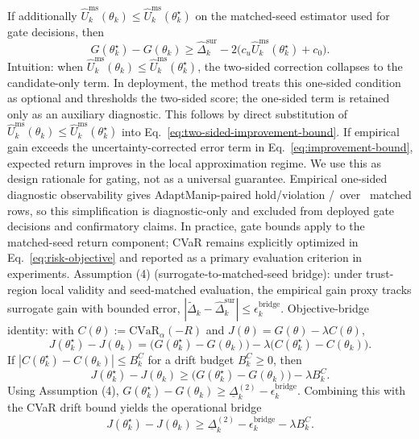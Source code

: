 \documentclass[letterpaper,10pt,conference]{ieeeconf}
\newcommand{\CoreCompAdaptManip}{AdaptManip}
\begin{document}
If additionally $\widehat{U}^{\mathrm{ms}}_k(\theta_k)\le \widehat{U}^{\mathrm{ms}}_k(\theta_k^\star)$ on the matched-seed estimator used for gate decisions, then
\begin{equation}
G(\theta_k^\star)-G(\theta_k)
\ge
\hat{\Delta}_k^{\mathrm{sur}} - 2\big(c_u \widehat{U}^{\mathrm{ms}}_k(\theta_k^\star) + c_0\big).
\label{eq:improvement-bound}
\end{equation}
Intuition: when $\widehat{U}^{\mathrm{ms}}_k(\theta_k)\le\widehat{U}^{\mathrm{ms}}_k(\theta_k^\star)$, the two-sided correction collapses to the candidate-only term. In deployment, the method treats this one-sided condition as optional and thresholds the two-sided score; the one-sided term is retained only as an auxiliary diagnostic.
This follows by direct substitution of $\widehat{U}^{\mathrm{ms}}_k(\theta_k)\le \widehat{U}^{\mathrm{ms}}_k(\theta_k^\star)$ into Eq.~\ref{eq:two-sided-improvement-bound}.
If empirical gain exceeds the uncertainty-corrected error term in Eq.~\ref{eq:improvement-bound}, expected return improves in the local approximation regime. We use this as design rationale for gating, not as a universal guarantee.
Empirical one-sided diagnostic observability gives \CoreCompAdaptManip-paired hold/violation \CorePropTwoProxyHoldRateAdapt/\CorePropTwoProxyViolationRateAdapt\ over \CorePropTwoProxyPairsAdapt\ matched rows, so this simplification is diagnostic-only and excluded from deployed gate decisions and confirmatory claims.
In practice, gate bounds apply to the matched-seed return component; CVaR remains explicitly optimized in Eq.~\ref{eq:risk-objective} and reported as a primary evaluation criterion in experiments.
Assumption (4) (surrogate-to-matched-seed bridge): under trust-region local validity and seed-matched evaluation, the empirical gain proxy tracks surrogate gain with bounded error, \( |\tilde{\Delta}_k-\hat{\Delta}^{\mathrm{sur}}_k|\le \epsilon^{\mathrm{bridge}}_k \).
Objective-bridge identity: with $C(\theta):=\mathrm{CVaR}_{\alpha}(-R)$ and $J(\theta)=G(\theta)-\lambda C(\theta)$,
\[
J(\theta_k^\star)-J(\theta_k)=\big(G(\theta_k^\star)-G(\theta_k)\big)-\lambda\big(C(\theta_k^\star)-C(\theta_k)\big).
\]
If $|C(\theta_k^\star)-C(\theta_k)|\le B^{C}_k$ for a drift budget $B^{C}_k\ge 0$, then
\[
J(\theta_k^\star)-J(\theta_k)\ge \big(G(\theta_k^\star)-G(\theta_k)\big)-\lambda B^{C}_k.
\]
Using Assumption (4), \(G(\theta_k^\star)-G(\theta_k)\ge \underline{\Delta}_k^{(2)}-\epsilon_k^{\mathrm{bridge}}\).
Combining this with the CVaR drift bound yields the operational bridge
\[
J(\theta_k^\star)-J(\theta_k)\ge \underline{\Delta}_k^{(2)}-\epsilon_k^{\mathrm{bridge}}-\lambda B^{C}_k.
\]
\end{document}
